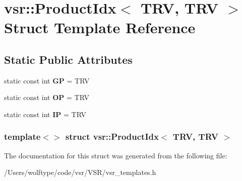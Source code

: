 \hypertarget{structvsr_1_1_product_idx_3_01_t_r_v_00_01_t_r_v_01_4}{\section{vsr\-:\-:Product\-Idx$<$ T\-R\-V, T\-R\-V $>$ Struct Template Reference}
\label{structvsr_1_1_product_idx_3_01_t_r_v_00_01_t_r_v_01_4}
}
\subsection*{Static Public Attributes}
\begin{DoxyCompactItemize}
\item 
\hypertarget{structvsr_1_1_product_idx_3_01_t_r_v_00_01_t_r_v_01_4_a0dc4a6981d928d796c1162b18924a838}{static const int {\bfseries G\-P} = T\-R\-V}\label{structvsr_1_1_product_idx_3_01_t_r_v_00_01_t_r_v_01_4_a0dc4a6981d928d796c1162b18924a838}

\item 
\hypertarget{structvsr_1_1_product_idx_3_01_t_r_v_00_01_t_r_v_01_4_a2385c848ad886c81de143843940c0777}{static const int {\bfseries O\-P} = T\-R\-V}\label{structvsr_1_1_product_idx_3_01_t_r_v_00_01_t_r_v_01_4_a2385c848ad886c81de143843940c0777}

\item 
\hypertarget{structvsr_1_1_product_idx_3_01_t_r_v_00_01_t_r_v_01_4_af358ff8b75f07758f6dba4a2f4be37e2}{static const int {\bfseries I\-P} = T\-R\-V}\label{structvsr_1_1_product_idx_3_01_t_r_v_00_01_t_r_v_01_4_af358ff8b75f07758f6dba4a2f4be37e2}

\end{DoxyCompactItemize}
\subsubsection*{template$<$$>$ struct vsr\-::\-Product\-Idx$<$ T\-R\-V, T\-R\-V $>$}



The documentation for this struct was generated from the following file\-:\begin{DoxyCompactItemize}
\item 
/\-Users/wolftype/code/vsr/\-V\-S\-R/vsr\-\_\-templates.\-h\end{DoxyCompactItemize}
